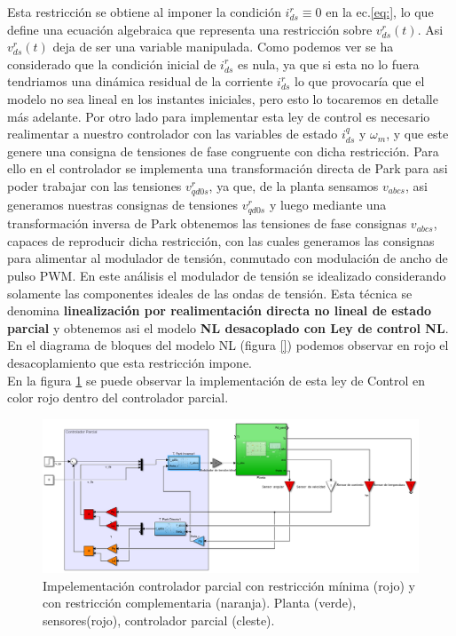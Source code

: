 \documentclass[10pt]{article}
\begin{document}
\begin{enumerate}
\begin{itemize}
	Esta restricción se obtiene al imponer la condición $i^{r}_{ds}\equiv 0$ en la ec.\ref{eq:}, lo que define una ecuación algebraica que representa una restricción sobre $v^{r}_{ds}(t)$. Asi $v^{r}_{ds}(t)$ deja de ser una variable manipulada. Como podemos ver se ha considerado que la condición inicial de $i^{r}_{ds}$ es nula, ya que si esta no lo fuera tendriamos una dinámica residual de la corriente $i^{r}_{ds}$ lo que provocaría que el modelo no sea lineal en los instantes iniciales, pero esto lo tocaremos en detalle más adelante. Por otro lado para implementar esta ley de control es necesario realimentar a nuestro controlador con las variables de estado $i^{q}_{ds}$ y $\omega_{m}$, y que este genere una consigna de tensiones de fase congruente con dicha restricción. Para ello en el controlador se implementa una transformación directa de Park para asi poder trabajar con las tensiones $v^{r}_{qd0s}$, ya que, de la planta sensamos $v_{abcs}$, asi generamos nuestras consignas de tensiones $v^{r}_{qd0s}$ y luego mediante una transformación inversa de Park obtenemos las tensiones de fase consignas $v_{abcs}$, capaces de reproducir dicha restricción, con las cuales generamos las consignas para alimentar al modulador de tensión, conmutado con modulación de ancho de pulso PWM. En este análisis el modulador de tensión se idealizado considerando solamente las componentes ideales de las ondas de tensión. Esta técnica se denomina \textbf{linealización por realimentación directa no lineal de estado parcial} y obtenemos asi el modelo \textbf{NL desacoplado con Ley de control NL}.\\
	 En el diagrama de bloques del modelo NL (figura \ref{})  podemos observar en rojo el desacoplamiento que esta restricción impone.\\
	  En la figura \ref{fig:diagrestriccionminima} se puede observar la implementación de esta ley de Control en color rojo dentro del controlador parcial.
	
	\begin{figure}[h!]
	\centering
	\includegraphics[width=\textwidth]{realimentacionNL.png}
	\caption{\label{fig:diagrestriccionminima} Impelementación controlador parcial con restricción mínima (rojo) y con restricción complementaria (naranja). Planta (verde), sensores(rojo), controlador parcial (cleste).}
	\end{figure}
	

\end{itemize}
\end{enumerate}
\end{document}

